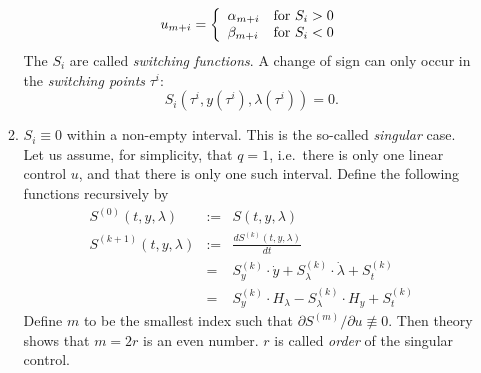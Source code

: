 \documentclass[12pt,a4paper]{article}
\begin{document}
\begin{enumerate}
\begin{enumerate}
\begin{equation}
                   u_{m+i} = \left\{\begin{array}{l@{\quad}l}
                                  \alpha_{m+i} & \mbox{for $S_{i} > 0$} \\
                                  \beta_{m+i} & \mbox{for $S_{i} < 0$}
                                \end{array}\right.
                 \end{equation}
               The $S_{i}$ are called {\em switching functions}. 
               A change of sign can only occur in the {\em switching points\/}
               $\tau^{i}$:
                 \begin{equation}
                   S_{i}(\tau^{i},y(\tau^{i}),\lambda(\tau^{i})) = 0.
                 \end{equation}
          \item $S_{i} \equiv 0$ within a non-empty interval. This is the so-called {\em singular\/} case.
                Let us assume, for simplicity, that $q=1$, i.e.\ there
                is only one linear control $u$, and that there is only
                one such interval.  Define the following functions
                recursively by
                 \begin{eqnarray}
                   S^{(0)}(t,y,\lambda) &:=& S(t,y,\lambda) \\
                   S^{(k+1)}(t,y,\lambda) &:=& \frac{d
                   S^{(k)}(t,y,\lambda)}{dt} \nonumber \\
                        &=& S^{(k)}_{y} \cdot \dot{y} +
                        S^{(k)}_{\lambda} \cdot \dot{\lambda} + S^{(k)}_{t}\\
                        &=&  S^{(k)}_{y} \cdot H_{\lambda} -
                             S^{(k)}_{\lambda} \cdot H_{y}  +  S^{(k)}_{t} \nonumber
                 \end{eqnarray}
                Define $m$ to be the smallest index such that
                $\partial S^{(m)}/\partial u \not\equiv 0$. Then
                theory \cite{th1,th2,th3} shows that $m = 2r$ is an even
                number. $r$ is called {\em order\/} of the singular
                control.
                

\end{enumerate}
\end{enumerate}
\end{document}
